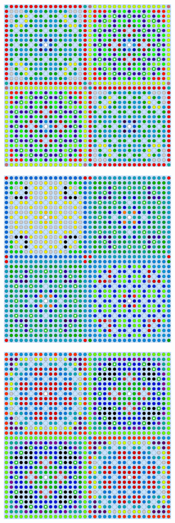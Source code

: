 \documentclass[12pt,twoside]{mitthesis-exec}
\begin{document}
\begin{figure}[h!]
\begin{subfigure}{0.47\textwidth}
  \includegraphics[width=0.7\linewidth]{figures/patterns/lns/2x2/materials}
  \caption{}
  \label{fig:2x2-lns}
\end{subfigure}%
\begin{subfigure}{0.47\textwidth}
  \centering
  \includegraphics[width=0.7\linewidth]{figures/patterns/lns/reflector/materials}
  \caption{}
  \label{fig:reflector-lns}
\end{subfigure}
\begin{subfigure}{0.47\textwidth}
  \centering
  \includegraphics[width=0.7\linewidth]{figures/unsupervised/geometries/with-features/8-clusters/combined/2x2}

\end{subfigure}
\end{figure}
\end{document}
